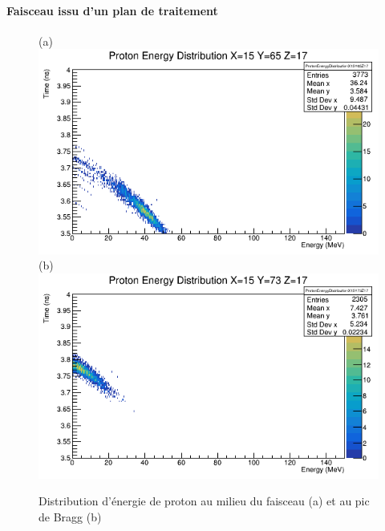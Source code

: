 \documentclass[11pt,a4paper,oldfontcommands]{memoir}
\begin{document}
\paragraph{Faisceau issu d'un plan de traitement}
\begin{figure}[h!]
\centering
\subfloat(a){\includegraphics[scale=0.37]{CT/TPS/faisceauprot.png}}
\subfloat(b){\includegraphics[scale=0.37]{CT/TPS/BraggProt.png}}
\caption{Distribution d'énergie de proton au milieu du faisceau (a) et au pic de Bragg (b)}
\label{tps prot}
\end{figure}
\end{document}
